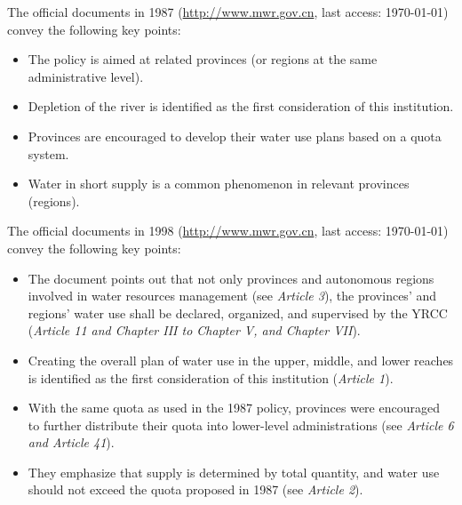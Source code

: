 \documentclass[default, sn-standardnature]{sn-jnl} %
\begin{document}
The official documents in 1987 (\href{http://www.gov.cn/zhengce/content/2011-03/30/content_3138.htm#}{http://www.mwr.gov.cn}, last access: \today) convey the following key points:

\begin{itemize}
	\item The policy is aimed at related provinces (or regions at the same administrative level).
	\item Depletion of the river is identified as the first consideration of this institution.
	\item Provinces are encouraged to develop their water use plans based on a quota system.
	\item Water in short supply is a common phenomenon in relevant provinces (regions).
\end{itemize}

The official documents in 1998
(\href{http://www.mwr.gov.cn/ztpd/2013ztbd/2013fxkh/fxkhswcbcs/cs/flfg/201304/t20130411_433489.html}{http://www.mwr.gov.cn}, last access: \today) convey the following key points:

\begin{itemize}
	\item The document points out that not only provinces and autonomous regions involved in water resources management (see \textit{Article 3}), the provinces’ and regions’ water use shall be declared, organized, and supervised by the YRCC (\textit{Article 11 and Chapter III to Chapter V, and Chapter VII}).
	\item Creating the overall plan of water use in the upper, middle, and lower reaches is identified as the first consideration of this institution (\textit{Article 1}).
	\item With the same quota as used in the 1987 policy, provinces were encouraged to further distribute their quota into lower-level administrations (see \textit{Article 6 and Article 41}).
	\item They emphasize that supply is determined by total quantity, and water use should not exceed the quota proposed in 1987 (see \textit{Article 2}).
\end{itemize}
\end{document}

